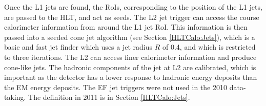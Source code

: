 Once the L1 jets are found, the RoIs, corresponding to the position of the L1 jets, are passed to the HLT, and act as seeds. 
The L2 jet trigger can access the course calorimeter information from around the L1 jet RoI. 
This information is then passed into a seeded cone jet algorithm (see Section \ref{HLTCalo:Jets}), which is a basic and fast jet finder which uses a jet radius $R$ of 0.4, and which is restricted to three iterations.
The L2 can access finer calorimeter information and produce cone-like jets.
The hadronic components of the jet at L2 are calibrated, which is important as the detector has a lower response to hadronic energy deposits than the EM energy deposits. 
The EF jet triggers were not used in the 2010 data-taking. 
The definition in 2011 is in Section \ref{HLTCalo:Jets}.



